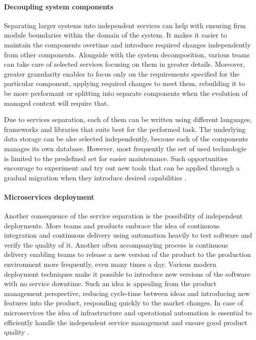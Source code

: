 \paragraph{Decoupling system components}

Separating larger systems into independent services can help with ensuring firm module boundaries within the domain of the system. It makes it easier to maintain the components overtime and introduce required changes independently from other components. Alongside with the system decomposition, various teams can take care of selected services focusing on them in greater details. Moreover, greater granularity enables to focus only on the requirements specified for the particular component, applying required changes to meet them, rebuilding it to be more performant or splitting into separate components when the evolution of managed context will require that.

Due to services separation, each of them can be written using different languages, frameworks and libraries that suits best for the performed task. The underlying data storage can be alse selected independently, because each of the components manages its own database. However, most frequently the set of used technologie is limited to the predefined set for easier maintenance. Such opportunities encourage to experiment and try out new tools that can be applied through a gradual migration when they introduce desired capabilities \cite{FowlerMicroservicesTradeoffs}.

\paragraph{Microservices deployment}

Another consequence of the service separation is the possibility of independent deployments. More teams and products embrace the idea of continuous integration and continuous delivery using automation heavily to test software and verify the quality of it. Another often accompanying process is continuous delivery enabling teams to release a new version of the product to the production environment more frequently, even many times a day. Various modern deployment techniques make it possible to introduce new versions of the software with no service downtime. Such an idea is appealing from the product management perspective, reducing cycle-time between ideas and introducing new features into the product, responding quickly to the market changes. In case of microservices the idea of infrastructure and operational automation is essential to efficiently handle the independent service management and ensure good product quality \cite{FowlerMicroservicesTradeoffs}.

